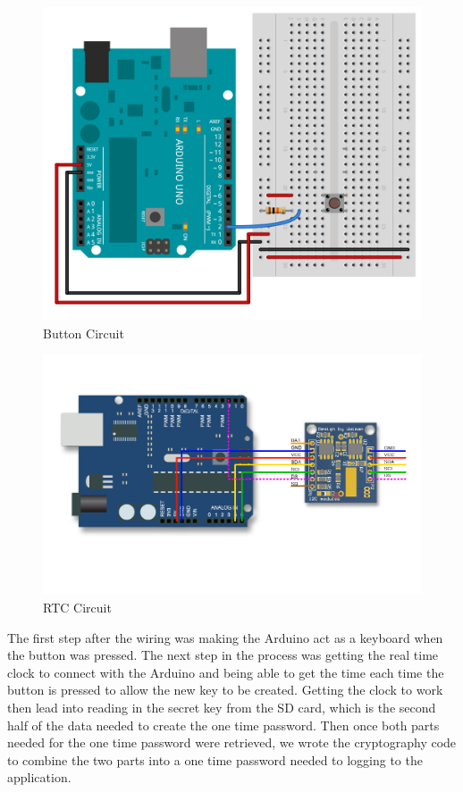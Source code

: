 \documentclass[conference]{IEEEtran}
\begin{document}
\begin{figure}[ht]
\centering
\includegraphics[width=\columnwidth]{button.png}
\caption{Button Circuit}
\label{fig:button}
\end{figure}

\begin{figure}[ht]
\centering
\includegraphics[width=\columnwidth]{rtc.jpg}
\caption{RTC Circuit}
\label{fig:rtc}
\end{figure}

The first step after the wiring was making the Arduino act as a keyboard when
the button was pressed.  The next step in the process was getting the real time
clock to connect with the Arduino and being able to get the time each time the
button is pressed to allow the new key to be created.   Getting the clock to
work then lead into reading in the secret key from the SD card, which is the
second half of the data needed to create the one time password. Then once both
parts needed for the one time password were retrieved, we wrote the
cryptography code to combine the two parts into a one time password needed to
logging to the application.
\end{document}
